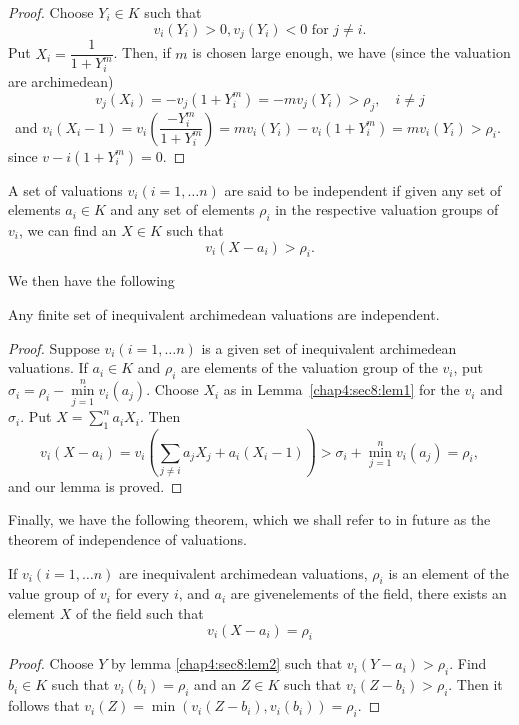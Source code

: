 \begin{proof}
  Choose $Y_i \in K$ such that
  $$
  v_i(Y_i) > 0, v_j(Y_i) < 0 \text{ for } j \neq i.
  $$
  Put $X_i = \dfrac{1}{1+Y^m_i}$. Then, if $m$ is chosen large enough,
  we have (since the valuation are archimedean) 
  $$
  v_j(X_i) = -v_j(1+Y^m_i) = -mv_j(Y_i) > \rho _j, \quad i \neq j
  $$\pageoriginale\
  and $v_i (X_i -1) = v_i (\dfrac{-Y^m_i}{1+Y^m_i}) = mv_i (Y_i) - v_i
  (1+Y^m_i) = mv_i (Y_i) > \rho_i$. since $v-i(1+Y^m_i)=0$. 
\end{proof}

A set of valuations $v_i (i=1, \ldots n)$ are said to be independent
if given any set of elements $a_i \in K$ and any set of elements
$\rho_i$ in the respective valuation groups of $v_i$, we can find an
$X \in K$ such that 
$$
v_i (X - a_i) > \rho_i.
$$

We then have the following
\begin{Lemma}\label{chap4:sec8:lem2}
  Any finite set of inequivalent archimedean valuations are independent.
\end{Lemma}

\begin{proof}
  Suppose $v_i(i=1, \ldots n)$ is a given set of inequivalent
  archimedean valuations. If $a_i \in K$ and $\rho_i$ are elements of
  the valuation group of the $v_i$, put $\sigma_i = \rho_i - \min
  \limits^n_{j=1} v_i(a_j)$. Choose $X_i$ as in Lemma~\ref{chap4:sec8:lem1} for the
  $v_i$ and $\sigma_i$. Put $X = \sum \limits^{n}_{1} a_i X_i$. Then 
  $$
  v_i (X-a_i) = v_i \left(\sum_{j \neq i} a_j X_j + a_i (X_i -1)\right) >
  \sigma_i + \min^n_{j=1}v_i (a_j) = \rho_i, 
  $$
  and our lemma is proved.
\end{proof}

Finally, we have the following theorem, which we shall refer to in
future as the theorem of independence of valuations. 

\begin{theorem*}
  If $v_i (i =1, \ldots n)$ are inequivalent archimedean valuations,
  $\rho_i$ is an element of the value group of $v_i$ for every $i$,
  and $a_i$ are given\pageoriginale elements of the field, there exists an element
  $X$ of the field such that 
  $$
  v_i (X - a_i) = \rho _i
  $$
\end{theorem*}

\begin{proof}
  Choose $Y$ by lemma \ref{chap4:sec8:lem2} such  that $v_i (Y-a_i) > \rho_i $. Find
  $b_i \in K $ such that $v_i(b_i) = \rho_i$ and an $Z \in K$ such
  that $v_i (Z-b_i) > \rho_i$. Then it follows that $v_i (Z)=\min (v_i
  (Z-b_i), v_i(b_i)) = \rho_i$. 
\end{proof}

